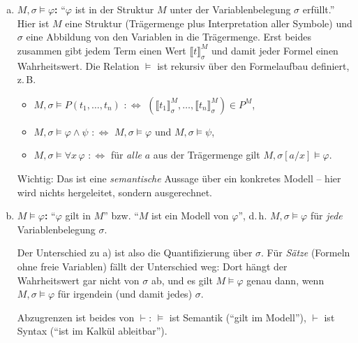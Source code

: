 \begin{loesung}
\begin{enumerate}[a)]
  \item \textbf{$M,\sigma\models\varphi$:} \enquote{$\varphi$ ist in der Struktur $M$ unter der Variablenbelegung $\sigma$ erfüllt.} Hier ist $M$ eine Struktur (Trägermenge plus Interpretation aller Symbole) und $\sigma$ eine Abbildung von den Variablen in die Trägermenge. Erst beides zusammen gibt jedem Term einen Wert $\llbracket t\rrbracket^M_\sigma$ und damit jeder Formel einen Wahrheitswert. Die Relation $\models$ ist rekursiv über den Formelaufbau definiert, z.\,B.
  \begin{itemize}
    \item $M,\sigma\models P(t_1,\dots,t_n)$ $:\Leftrightarrow$ $(\llbracket t_1\rrbracket^M_\sigma,\dots,\llbracket t_n\rrbracket^M_\sigma)\in P^M$,
    \item $M,\sigma\models\varphi\wedge\psi$ $:\Leftrightarrow$ $M,\sigma\models\varphi$ und $M,\sigma\models\psi$,
    \item $M,\sigma\models\forall x\,\varphi$ $:\Leftrightarrow$ für \emph{alle} $a$ aus der Trägermenge gilt $M,\sigma[a/x]\models\varphi$.
  \end{itemize}
  Wichtig: Das ist eine \emph{semantische} Aussage über ein konkretes Modell -- hier wird nichts hergeleitet, sondern ausgerechnet.

  \item \textbf{$M\models\varphi$:} \enquote{$\varphi$ gilt in $M$} bzw. \enquote{$M$ ist ein Modell von $\varphi$}, d.\,h. $M,\sigma\models\varphi$ für \emph{jede} Variablenbelegung $\sigma$.

  Der Unterschied zu a) ist also die Quantifizierung über $\sigma$. Für \emph{Sätze} (Formeln ohne freie Variablen) fällt der Unterschied weg: Dort hängt der Wahrheitswert gar nicht von $\sigma$ ab, und es gilt $M\models\varphi$ genau dann, wenn $M,\sigma\models\varphi$ für irgendein (und damit jedes) $\sigma$.

  Abzugrenzen ist beides von $\vdash$: $\models$ ist Semantik (\enquote{gilt im Modell}), $\vdash$ ist Syntax (\enquote{ist im Kalkül ableitbar}).
\end{enumerate}
\end{loesung}

